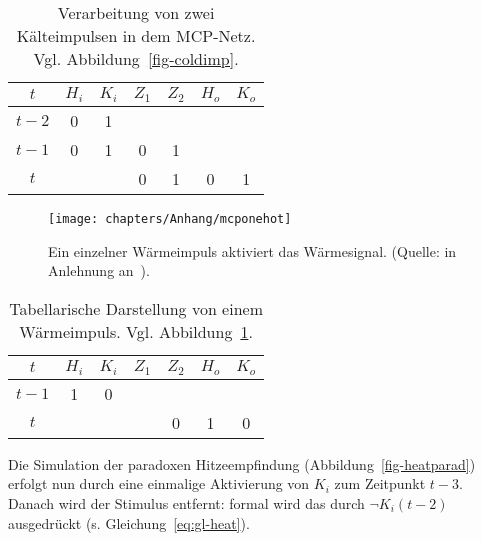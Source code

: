 \begin{table} %
    \centering
    \begin{tabular}{c | c | c | c | c | c | c}
        $t$   & $H_i$ & $K_i$ & $Z_1$ & $Z_2$ & $H_o$ & $K_o$ \\
        \hline
        $t-2$ & 0     & 1     &          &          &          &          \\
        $t-1$ & 0     & 1     & 0        & 1        &          &          \\
        $t$   &       &       & 0         & 1         & 0        & 1        \\
    \end{tabular}
    \caption{Verarbeitung von zwei Kälteimpulsen in dem MCP-Netz. Vgl. Abbildung~\ref{fig-coldimp}.}
    \label{tab:coldimp}
\end{table}


\begin{figure}[h]
    \centering
    \texttt{[image: chapters/Anhang/mcponehot]}
    \caption{Ein einzelner Wärmeimpuls aktiviert das Wärmesignal. (Quelle: in Anlehnung an~\cite[36, Figure 1.24]{Fau94}).}
    \label{fig-heatimp}
\end{figure}



\begin{table} %
    \centering
    \begin{tabular}{c | c | c | c | c | c | c}
        $t$   & $H_i$ & $K_i$ & $Z_1$ & $Z_2$ & $H_o$ & $K_o$ \\
        \hline
        $t-1$ & 1     & 0     &          &          &          &          \\
        $t$   &       &       &          & 0         & 1        & 0        \\
    \end{tabular}
    \caption{Tabellarische Darstellung von einem Wärmeimpuls. Vgl. Abbildung~\ref{fig-heatimp}.}
    \label{tab:heatimp}
\end{table}



Die Simulation der paradoxen Hitzeempfindung (Abbildung~\ref{fig-heatparad}) erfolgt nun durch eine einmalige Aktivierung von $K_i$ zum Zeitpunkt $t-3$.
Danach wird der Stimulus entfernt: formal wird das durch $\neg K_i (t-2)$ ausgedrückt (s. Gleichung~\ref{eq:gl-heat}).

